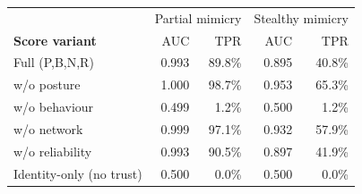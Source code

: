 \begin{tabular}{@{}lrrrr@{}}
\toprule
& \multicolumn{2}{c}{Partial mimicry} & \multicolumn{2}{c}{Stealthy mimicry} \\
\textbf{Score variant} & AUC & TPR & AUC & TPR \\
\midrule
Full (P,B,N,R) & 0.993 & 89.8\% & 0.895 & 40.8\% \\
w/o posture & 1.000 & 98.7\% & 0.953 & 65.3\% \\
w/o behaviour & 0.499 & 1.2\% & 0.500 & 1.2\% \\
w/o network & 0.999 & 97.1\% & 0.932 & 57.9\% \\
w/o reliability & 0.993 & 90.5\% & 0.897 & 41.9\% \\
Identity-only (no trust) & 0.500 & 0.0\% & 0.500 & 0.0\% \\
\bottomrule
\end{tabular}